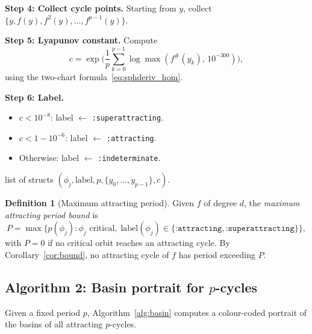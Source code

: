 \documentclass[12pt]{article}
\theoremstyle{definition}
\newtheorem{definition}[theorem]{Definition}
\newcommand{\fsh}{f^{\#}}
\begin{document}
\begin{algorithm}[h]
\begin{algorithmic}[1]
\State \textbf{Step 4: Collect cycle points.}
  Starting from $y$, collect $\{y, f(y), f^2(y), \ldots, f^{p-1}(y)\}$.

\State \textbf{Step 5: Lyapunov constant.}
  Compute
  \[
    c = \exp\!\biggl(\frac{1}{p}\sum_{k=0}^{p-1}
                     \log\max(\fsh(y_k),\,10^{-300})\biggr),
  \]
  using the two-chart formula~\eqref{eq:sphderiv_hom}.

\State \textbf{Step 6: Label.}
  \begin{itemize}[noitemsep]
    \item $c<10^{-8}$: label $\leftarrow$ \texttt{:superattracting}.
    \item $c<1-10^{-6}$: label $\leftarrow$ \texttt{:attracting}.
    \item Otherwise: label $\leftarrow$ \texttt{:indeterminate}.
  \end{itemize}

\State \Return list of structs
  $(\phi_j, \mathrm{label}, p, \{y_0,\ldots,y_{p-1}\}, c)$.
\end{algorithmic}
\end{algorithm}

\begin{definition}[Maximum attracting period]\label{def:P}
Given $f$ of degree $d$, the \emph{maximum attracting period bound} is
\[
  P = \max\bigl\{p(\phi_j) : \phi_j\text{ critical},\;
                 \mathrm{label}(\phi_j)\in\{
                 \texttt{:attracting},\texttt{:superattracting}\}\bigr\},
\]
with $P=0$ if no critical orbit reaches an attracting cycle.  By
Corollary~\ref{cor:bound}, no attracting cycle of $f$ has period
exceeding $P$.
\end{definition}

\subsection{Algorithm 2: Basin portrait for $p$-cycles}

Given a fixed period $p$, Algorithm~\ref{alg:basin} computes a colour-coded
portrait of the basins of all attracting $p$-cycles.
\end{document}
